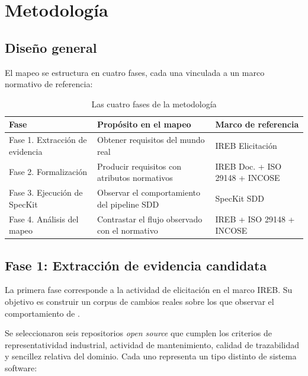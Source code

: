\section{Metodolog\'ia}
\label{sec:metodologia}

\subsection{Dise\~no general}

El mapeo se estructura en cuatro fases, cada una vinculada a un marco normativo de referencia:

\begin{table}[h]
\centering
\caption{Las cuatro fases de la metodolog\'ia}
\label{tab:fases}
\begin{tabularx}{\textwidth}{lXl}
\toprule
\textbf{Fase} & \textbf{Prop\'osito en el mapeo} & \textbf{Marco de referencia} \\
\midrule
Fase 1. Extracci\'on de evidencia & Obtener requisitos del mundo real & IREB Elicitaci\'on \\
Fase 2. Formalizaci\'on & Producir requisitos con atributos normativos & IREB Doc. + ISO 29148 + INCOSE \\
Fase 3. Ejecuci\'on de SpecKit & Observar el comportamiento del pipeline SDD & SpecKit SDD \\
Fase 4. An\'alisis del mapeo & Contrastar el flujo observado con el normativo & IREB + ISO 29148 + INCOSE \\
\bottomrule
\end{tabularx}
\end{table}

\subsection{Fase 1: Extracci\'on de evidencia candidata}

La primera fase corresponde a la actividad de elicitaci\'on en el marco IREB. Su objetivo es construir un corpus de cambios reales sobre los que observar el comportamiento de \speckit.

Se seleccionaron seis repositorios \emph{open source} que cumplen los criterios de representatividad industrial, actividad de mantenimiento, calidad de trazabilidad y sencillez relativa del dominio. Cada uno representa un tipo distinto de sistema software:

